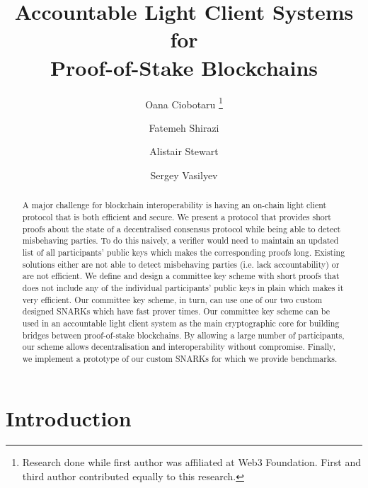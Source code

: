 \documentclass[runningheads]{llncs}
\begin{document}
\title{Accountable Light Client Systems for \\ Proof-of-Stake Blockchains}

\author{Oana Ciobotaru  \thanks{Research done while first author was affiliated at Web3 Foundation. First and third author contributed equally to this research.} 
\and Fatemeh Shirazi  \and Alistair Stewart  \and Sergey Vasilyev }


\maketitle


\begin{abstract} A major challenge for blockchain interoperability is having an on-chain light client protocol that is both efficient 
and secure. We present a protocol that provides short proofs about the state of a decentralised consensus protocol while being 
able to detect misbehaving parties. To do this naively, a verifier would need to maintain an updated list of all participants' public 
keys which makes the corresponding proofs long. Existing solutions either are not able to detect misbehaving parties (i.e. lack 
accountability) or are not efficient. We define and design a committee key scheme with short proofs that does not include any 
of the individual participants' public keys in plain which makes it very efficient. Our committee key scheme, in turn, can use 
one of our two custom designed SNARKs which have fast prover times. Our committee key scheme can be used in an 
accountable light client system as the main cryptographic core for building bridges between proof-of-stake blockchains. 
By allowing a large number of participants, our scheme allows decentralisation and interoperability without compromise. 
Finally, we implement a prototype of our custom SNARKs for which we provide benchmarks.

\end{abstract}


\section{Introduction} \label{sec_intro}

\end{document}
